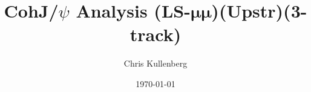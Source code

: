\title{CohJ/$\psi$ Analysis (\textbf{LS}-$\boldsymbol{\mu\mu}$)(\textbf{Upstr})(\textbf{3-track})}
\author{Chris Kullenberg}
\date{\today}
